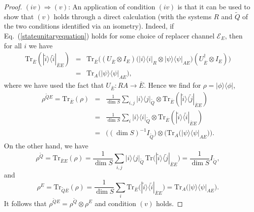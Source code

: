 \documentclass[11pt]{amsart}
\theoremstyle{definition}
\theoremstyle{definition}
\theoremstyle{definition}
\newcommand{\tr}{\textrm{Tr}}
\newcommand{\1}{\mathbb{I}}
\newcommand{\T}[1]{\widetilde{#1}} %
\def\kb#1#2{|#1\rangle\!\langle #2 |}
\begin{document}
\begin{proof}
$(iv)\Rightarrow (v)$: An application of condition $(iv)$ is that it can be used to show that $(v)$ holds through a direct calculation (with the systems $R$ and $\T{Q}$ of the two conditions identified via an isometry). Indeed, if Eq.~(\ref{stateunitaryequation}) holds for some choice of replacer channel $\mathcal E_E$, then for all $i$ we have 
\begin{eqnarray*}
\tr_{\overline{E}} ( \kb{\widetilde{i}}{\widetilde{i}}_{\overline{E}E} ) &=& 
    \tr_{\overline{E}} \big( (U_{\overline{E}} \otimes I_E ) \big( \kb{i}{i}_R \otimes \kb{\psi}{\psi}_{A E} \big)  (U_{\overline{E}}^\dagger  \otimes I_E ) \big) \\ 
      &=& \tr_{A}  \big( \kb{\psi}{\psi}_{A E} \big), 
\end{eqnarray*}
where we have used the fact that $U_{\overline{E}} : R A \rightarrow \overline{E}$. 
Hence we find for $\rho = \kb{\phi}{\phi}$, 
\begin{eqnarray*}
\rho^{\T{Q}E} = \tr_{\overline{E}}(\rho) &=& \frac{1}{\dim S} \sum_{i,j} \kb{i}{j}_{\T{Q}} \otimes \tr_{\overline{E}} ( \kb{\widetilde{i}}{\widetilde{j}}_{\overline{E}E} ) \\ 
&=& \frac{1}{\dim S} \sum_{i} \kb{i}{i}_{\T{Q}} \otimes \tr_{\overline{E}} ( \kb{\widetilde{i}}{\widetilde{i}}_{\overline{E}E} ) \\
&=& \Big( (\dim S)^{-1} I_{{\T{Q}}} \Big) \otimes \Big(  \tr_{A} \big( \kb{\psi}{\psi}_{AE} \big) \Big) .  
\end{eqnarray*}
On the other hand, we have 
\[
\rho^{\T{Q}} = \tr_{\overline{E}E}(\rho) = \frac{1}{\dim S} \sum_{i,j} \kb{i}{j}_{\T{Q}} \, \tr \big(  \kb{\widetilde{i}}{\widetilde{j}}_{\overline{E}E}   \big) = \frac{1}{\dim S} I_{\T{Q}}, 
\]
and 
\[
\rho^{E} = \tr_{\T{Q}\overline{E}}(\rho) = \frac{1}{\dim S} \sum_i \tr_{\overline{E}} \big( \kb{\widetilde{i}}{\widetilde{i}}_{\overline{E}E} \big) = \tr_{A}  \big( \kb{\psi}{\psi}_{AE} \big). 
\]
It follows that $\rho^{\T{Q}E} = \rho^{\T{Q}} \otimes \rho^E$ and condition $(v)$ holds. 


\end{proof}
\end{document}
